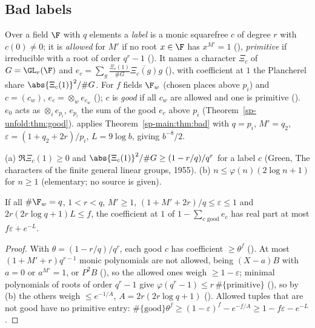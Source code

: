 \subsection{Bad labels}\label{sp-main:ss:bad}

Over a field $\F$ with $q$ elements a \emph{label} is a monic squarefree $c$ of degree $r$ with
$c(0)\ne0$; it is \emph{allowed} for $M'$ if no root $x\in\F$ has $x^{M'}=1$
(), \emph{primitive} if irreducible with a root of order $q^r-1$
(). It names a character $\Xi_c$ of $G=\GL_r(\F)$ and
$e_c=\sum_g\frac{\Xi_c(1)}{\#G}\overline{\Xi_c(g)}g$ (), with coefficient at $1$
the Plancherel share $\abs{\Xi_c(1)}^2/\#G$. For $f$ fields $\F_w$ (chosen places above $p_i$) and $c=(c_w)$, $e_c=\otimes_we_{c_w}$
(); $c$ is \emph{good} if all $c_w$ are allowed and one is primitive
(). $e_0$ acts as $\otimes_ie_{p_i}$, $e_{p_i}$ the sum of the good $e_c$ above $p_i$
(Theorem~\ref{sp-unfold:thm:good}). 
applies Theorem~\ref{sp-main:thm:bad} with $q=p_i$, $M'=q_2$, $\varepsilon=(1+q_2+2r)/p_i$,
$L=9\log b$, giving $b^{-8}/2$.

\begin{fact}\label{sp-main:fact:green}
(a) $\Re\Xi_c(1)\ge0$ and $\abs{\Xi_c(1)}^2/\#G\ge(1-r/q)/q^r$ for a label $c$ (Green, The characters
of the finite general linear groups, 1955). (b) $n\le\varphi(n)(2\log n+1)$ for $n\ge1$ (elementary; no source is given).
\end{fact}

\begin{theorem}\label{sp-main:thm:bad}
If all $\#\F_w=q$, $1<r<q$, $M'\ge1$, $(1+M'+2r)/q\le\varepsilon\le1$ and $2r(2r\log q+1)L\le f$, the coefficient at
$1$ of $1-\sum_{c\text{ good}}e_c$ has real part at most $f\varepsilon+e^{-L}$.
\end{theorem}

\begin{proof}
With $\theta=(1-r/q)/q^r$, each good $c$ has coefficient $\ge\theta^f$ ().
At most $(1+M'+r)q^{r-1}$ monic polynomials are not allowed, being $(X-a)B$ with $a=0$ or $a^{M'}=1$, or
$P^2B$ (), so the allowed ones weigh $\ge1-\varepsilon$;
minimal polynomials of roots of order $q^r-1$ give $\varphi(q^r-1)\le r\,\#\{\text{primitive}\}$
(), so by (b) the others weigh $\le e^{-1/A}$,
$A=2r(2r\log q+1)$ (). Allowed tuples that are not good have no
primitive entry: $\#\{\text{good}\}\theta^f\ge(1-\varepsilon)^f-e^{-f/A}\ge1-f\varepsilon-e^{-L}$.
\end{proof}
